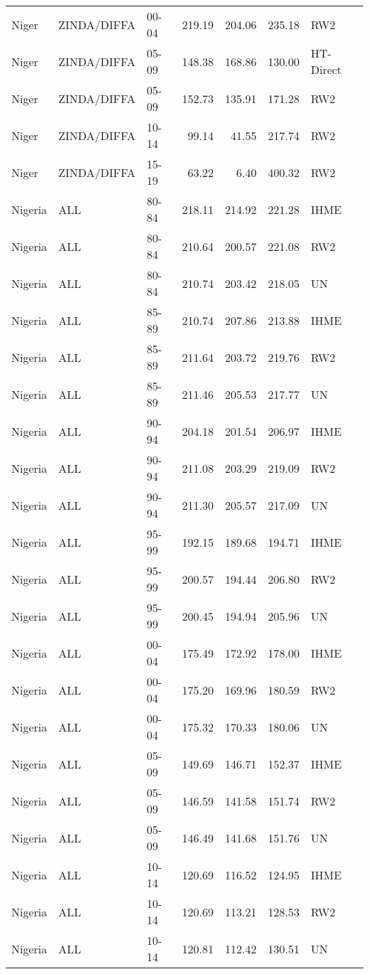 \begin{longtable}{lllrrrl}
  Niger & ZINDA/DIFFA & 00-04 & 219.19 & 204.06 & 235.18 & RW2 \\ 
  Niger & ZINDA/DIFFA & 05-09 & 148.38 & 168.86 & 130.00 & HT-Direct \\ 
  Niger & ZINDA/DIFFA & 05-09 & 152.73 & 135.91 & 171.28 & RW2 \\ 
  Niger & ZINDA/DIFFA & 10-14 & 99.14 & 41.55 & 217.74 & RW2 \\ 
  Niger & ZINDA/DIFFA & 15-19 & 63.22 & 6.40 & 400.32 & RW2 \\ 
  Nigeria & ALL & 80-84 & 218.11 & 214.92 & 221.28 & IHME \\ 
  Nigeria & ALL & 80-84 & 210.64 & 200.57 & 221.08 & RW2 \\ 
  Nigeria & ALL & 80-84 & 210.74 & 203.42 & 218.05 & UN \\ 
  Nigeria & ALL & 85-89 & 210.74 & 207.86 & 213.88 & IHME \\ 
  Nigeria & ALL & 85-89 & 211.64 & 203.72 & 219.76 & RW2 \\ 
  Nigeria & ALL & 85-89 & 211.46 & 205.53 & 217.77 & UN \\ 
  Nigeria & ALL & 90-94 & 204.18 & 201.54 & 206.97 & IHME \\ 
  Nigeria & ALL & 90-94 & 211.08 & 203.29 & 219.09 & RW2 \\ 
  Nigeria & ALL & 90-94 & 211.30 & 205.57 & 217.09 & UN \\ 
  Nigeria & ALL & 95-99 & 192.15 & 189.68 & 194.71 & IHME \\ 
  Nigeria & ALL & 95-99 & 200.57 & 194.44 & 206.80 & RW2 \\ 
  Nigeria & ALL & 95-99 & 200.45 & 194.94 & 205.96 & UN \\ 
  Nigeria & ALL & 00-04 & 175.49 & 172.92 & 178.00 & IHME \\ 
  Nigeria & ALL & 00-04 & 175.20 & 169.96 & 180.59 & RW2 \\ 
  Nigeria & ALL & 00-04 & 175.32 & 170.33 & 180.06 & UN \\ 
  Nigeria & ALL & 05-09 & 149.69 & 146.71 & 152.37 & IHME \\ 
  Nigeria & ALL & 05-09 & 146.59 & 141.58 & 151.74 & RW2 \\ 
  Nigeria & ALL & 05-09 & 146.49 & 141.68 & 151.76 & UN \\ 
  Nigeria & ALL & 10-14 & 120.69 & 116.52 & 124.95 & IHME \\ 
  Nigeria & ALL & 10-14 & 120.69 & 113.21 & 128.53 & RW2 \\ 
  Nigeria & ALL & 10-14 & 120.81 & 112.42 & 130.51 & UN \\ 

\end{longtable}
